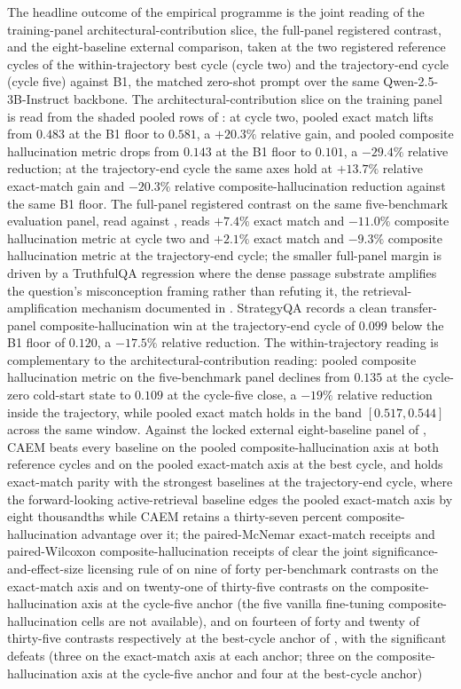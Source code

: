 The headline outcome of the empirical programme is the joint reading of the training-panel architectural-contribution slice, the full-panel registered contrast, and the eight-baseline external comparison, taken at the two registered reference cycles of the within-trajectory best cycle (cycle two) and the trajectory-end cycle (cycle five) against B1, the matched zero-shot prompt over the same Qwen-2.5-3B-Instruct backbone. The architectural-contribution slice on the training panel is read from the shaded pooled rows of : at cycle two, pooled exact match lifts from $0.483$ at the B1 floor to $0.581$, a $+20.3\%$ relative gain, and pooled composite hallucination metric drops from $0.143$ at the B1 floor to $0.101$, a $-29.4\%$ relative reduction; at the trajectory-end cycle the same axes hold at $+13.7\%$ relative exact-match gain and $-20.3\%$ relative composite-hallucination reduction against the same B1 floor. The full-panel registered contrast on the same five-benchmark evaluation panel, read against , reads $+7.4\%$ exact match and $-11.0\%$ composite hallucination metric at cycle two and $+2.1\%$ exact match and $-9.3\%$ composite hallucination metric at the trajectory-end cycle; the smaller full-panel margin is driven by a TruthfulQA regression where the dense passage substrate amplifies the question's misconception framing rather than refuting it, the retrieval-amplification mechanism documented in . StrategyQA records a clean transfer-panel composite-hallucination win at the trajectory-end cycle of $0.099$ below the B1 floor of $0.120$, a $-17.5\%$ relative reduction. The within-trajectory reading is complementary to the architectural-contribution reading: pooled composite hallucination metric on the five-benchmark panel declines from $0.135$ at the cycle-zero cold-start state to $0.109$ at the cycle-five close, a $-19\%$ relative reduction inside the trajectory, while pooled exact match holds in the band $[0.517, 0.544]$ across the same window. Against the locked external eight-baseline panel of , CAEM beats every baseline on the pooled composite-hallucination axis at both reference cycles and on the pooled exact-match axis at the best cycle, and holds exact-match parity with the strongest baselines at the trajectory-end cycle, where the forward-looking active-retrieval baseline edges the pooled exact-match axis by eight thousandths while CAEM retains a thirty-seven percent composite-hallucination advantage over it; the paired-McNemar exact-match receipts and paired-Wilcoxon composite-hallucination receipts of  clear the joint significance-and-effect-size licensing rule of  on nine of forty per-benchmark contrasts on the exact-match axis and on twenty-one of thirty-five contrasts on the composite-hallucination axis at the cycle-five anchor (the five vanilla fine-tuning composite-hallucination cells are not available), and on fourteen of forty and twenty of thirty-five contrasts respectively at the best-cycle anchor of , with the significant defeats (three on the exact-match axis at each anchor; three on the composite-hallucination axis at the cycle-five anchor and four at the best-cycle anchor) 